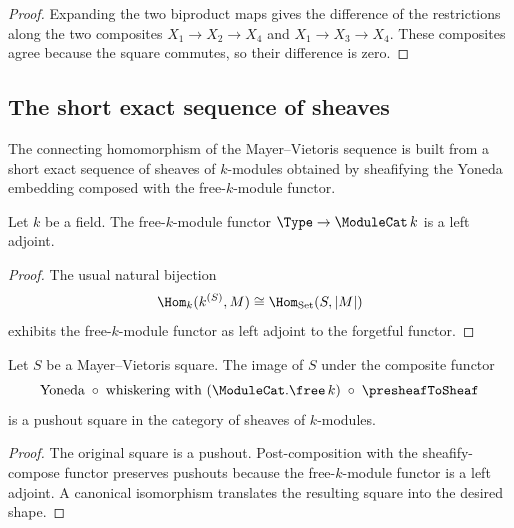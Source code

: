 \begin{proof}

  \leanok
  Expanding the two biproduct maps gives the difference of the restrictions along the two composites \(X_1\to X_2\to X_4\) and \(X_1\to X_3\to X_4\). These composites agree because the square commutes, so their difference is zero.
\end{proof}

\subsection{The short exact sequence of sheaves}

The connecting homomorphism of the Mayer--Vietoris sequence is built from a short exact sequence of sheaves of \(k\)-modules obtained by sheafifying the Yoneda embedding composed with the free-\(k\)-module functor.

\begin{definition}\leanok
  \label{def:Scheme_ModuleCat_free_isLeftAdjoint}
  Let \(k\) be a field. The free-\(k\)-module functor \(\Type \to \ModuleCat\,k\) is a left adjoint.
\end{definition}

\begin{proof}
  \leanok
  The usual natural bijection
  \[
    \Hom_k(k^{(S)},M)\cong \Hom_{\mathrm{Set}}(S,|M|)
  \]
  exhibits the free-\(k\)-module functor as left adjoint to the forgetful functor.
\end{proof}

\begin{lemma}\leanok
  \label{lem:Scheme_HModule_prime_isPushoutModuleCatFreeSheaf}

  Let \(S\) be a Mayer--Vietoris square. The image of \(S\) under the composite functor
  \[
    \text{Yoneda} \;\circ\; \text{whiskering with }(\ModuleCat.\free\,k) \;\circ\; \presheafToSheaf
  \]
  is a pushout square in the category of sheaves of \(k\)-modules.
\end{lemma}

\begin{proof}

  \leanok
  The original square is a pushout. Post-composition with the sheafify-compose functor preserves pushouts because the free-\(k\)-module functor is a left adjoint. A canonical isomorphism translates the resulting square into the desired shape.
\end{proof}

